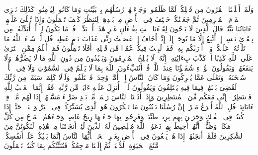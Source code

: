 \stopbuffer
\startbuffer[\q:10:13]
وَلَقَدۡ أَهۡلَكۡنَا ٱلۡقُرُونَ مِن قَبۡلِكُمۡ لَمَّا ظَلَمُوا۟ وَجَاۤءَتۡهُمۡ رُسُلُهُم بِٱلۡبَیِّنَٰتِ وَمَا كَانُوا۟ لِیُؤۡمِنُوا۟ۚ كَذَٰلِكَ نَجۡزِی ٱلۡقَوۡمَ ٱلۡمُجۡرِمِینَ%
\stopbuffer
\startbuffer[\q:10:14]
ثُمَّ جَعَلۡنَٰكُمۡ خَلَٰۤئِفَ فِی ٱلۡأَرۡضِ مِنۢ بَعۡدِهِمۡ لِنَنظُرَ كَیۡفَ تَعۡمَلُونَ%
\stopbuffer
\startbuffer[\q:10:15]
وَإِذَا تُتۡلَىٰ عَلَیۡهِمۡ ءَایَاتُنَا بَیِّنَٰتࣲ قَالَ ٱلَّذِینَ لَا یَرۡجُونَ لِقَاۤءَنَا ٱئۡتِ بِقُرۡءَانٍ غَیۡرِ هَٰذَاۤ أَوۡ بَدِّلۡهُۚ قُلۡ مَا یَكُونُ لِیۤ أَنۡ أُبَدِّلَهُۥ مِن تِلۡقَاۤئِ نَفۡسِیۤۖ إِنۡ أَتَّبِعُ إِلَّا مَا یُوحَىٰۤ إِلَیَّۖ إِنِّیۤ أَخَافُ إِنۡ عَصَیۡتُ رَبِّی عَذَابَ یَوۡمٍ عَظِیمࣲ%
\stopbuffer
\startbuffer[\q:10:16]
قُل لَّوۡ شَاۤءَ ٱللَّهُ مَا تَلَوۡتُهُۥ عَلَیۡكُمۡ وَلَاۤ أَدۡرَىٰكُم بِهِۦۖ فَقَدۡ لَبِثۡتُ فِیكُمۡ عُمُرࣰا مِّن قَبۡلِهِۦۤۚ أَفَلَا تَعۡقِلُونَ%
\stopbuffer
\startbuffer[\q:10:17]
فَمَنۡ أَظۡلَمُ مِمَّنِ ٱفۡتَرَىٰ عَلَى ٱللَّهِ كَذِبًا أَوۡ كَذَّبَ بِءَایَٰتِهِۦۤۚ إِنَّهُۥ لَا یُفۡلِحُ ٱلۡمُجۡرِمُونَ%
\stopbuffer
\startbuffer[\q:10:18]
وَیَعۡبُدُونَ مِن دُونِ ٱللَّهِ مَا لَا یَضُرُّهُمۡ وَلَا یَنفَعُهُمۡ وَیَقُولُونَ هَٰۤؤُلَاۤءِ شُفَعَٰۤؤُنَا عِندَ ٱللَّهِۚ قُلۡ أَتُنَبِّءُونَ ٱللَّهَ بِمَا لَا یَعۡلَمُ فِی ٱلسَّمَٰوَٰتِ وَلَا فِی ٱلۡأَرۡضِۚ سُبۡحَٰنَهُۥ وَتَعَٰلَىٰ عَمَّا یُشۡرِكُونَ%
\stopbuffer
\startbuffer[\q:10:19]
وَمَا كَانَ ٱلنَّاسُ إِلَّاۤ أُمَّةࣰ وَٰحِدَةࣰ فَٱخۡتَلَفُوا۟ۚ وَلَوۡلَا كَلِمَةࣱ سَبَقَتۡ مِن رَّبِّكَ لَقُضِیَ بَیۡنَهُمۡ فِیمَا فِیهِ یَخۡتَلِفُونَ%
\stopbuffer
\startbuffer[\q:10:20]
وَیَقُولُونَ لَوۡلَاۤ أُنزِلَ عَلَیۡهِ ءَایَةࣱ مِّن رَّبِّهِۦۖ فَقُلۡ إِنَّمَا ٱلۡغَیۡبُ لِلَّهِ فَٱنتَظِرُوۤا۟ إِنِّی مَعَكُم مِّنَ ٱلۡمُنتَظِرِینَ%
\stopbuffer
\startbuffer[\q:10:21]
وَإِذَاۤ أَذَقۡنَا ٱلنَّاسَ رَحۡمَةࣰ مِّنۢ بَعۡدِ ضَرَّاۤءَ مَسَّتۡهُمۡ إِذَا لَهُم مَّكۡرࣱ فِیۤ ءَایَاتِنَاۚ قُلِ ٱللَّهُ أَسۡرَعُ مَكۡرًاۚ إِنَّ رُسُلَنَا یَكۡتُبُونَ مَا تَمۡكُرُونَ%
\stopbuffer
\startbuffer[\q:10:22]
هُوَ ٱلَّذِی یُسَیِّرُكُمۡ فِی ٱلۡبَرِّ وَٱلۡبَحۡرِۖ حَتَّىٰۤ إِذَا كُنتُمۡ فِی ٱلۡفُلۡكِ وَجَرَیۡنَ بِهِم بِرِیحࣲ طَیِّبَةࣲ وَفَرِحُوا۟ بِهَا جَاۤءَتۡهَا رِیحٌ عَاصِفࣱ وَجَاۤءَهُمُ ٱلۡمَوۡجُ مِن كُلِّ مَكَانࣲ وَظَنُّوۤا۟ أَنَّهُمۡ أُحِیطَ بِهِمۡ دَعَوُا۟ ٱللَّهَ مُخۡلِصِینَ لَهُ ٱلدِّینَ لَئِنۡ أَنجَیۡتَنَا مِنۡ هَٰذِهِۦ لَنَكُونَنَّ مِنَ ٱلشَّٰكِرِینَ%
\stopbuffer
\startbuffer[\q:10:23]
فَلَمَّاۤ أَنجَىٰهُمۡ إِذَا هُمۡ یَبۡغُونَ فِی ٱلۡأَرۡضِ بِغَیۡرِ ٱلۡحَقِّۗ یَٰۤأَیُّهَا ٱلنَّاسُ إِنَّمَا بَغۡیُكُمۡ عَلَىٰۤ أَنفُسِكُمۖ مَّتَٰعَ ٱلۡحَیَوٰةِ ٱلدُّنۡیَاۖ ثُمَّ إِلَیۡنَا مَرۡجِعُكُمۡ فَنُنَبِّئُكُم بِمَا كُنتُمۡ تَعۡمَلُونَ%
\stopbuffer
\startbuffer[\q:10:24]
